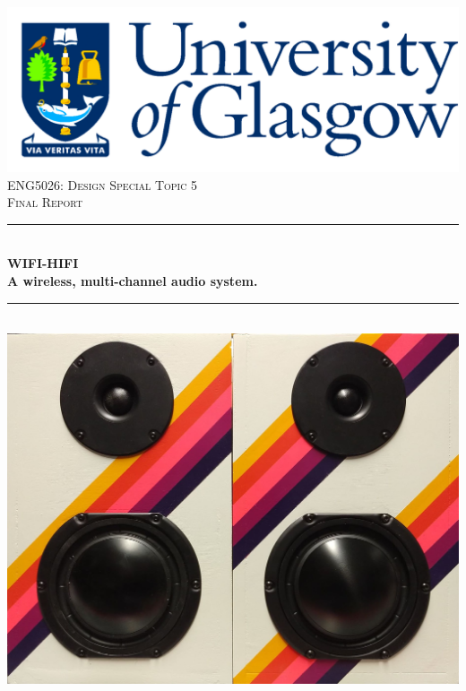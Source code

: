 \begin{titlepage}
\setcounter{page}{0}
\newcommand{\HRule}{\rule{\linewidth}{0.5mm}} %

\center %
 
\includegraphics[scale=0.1]{figs/GlaLogo.pdf}\\[0.5cm]

\vspace{1cm}
\textsc{\LARGE ENG5026: Design Special Topic 5}\\[0.5cm] 
\textsc{\Large Final Report}\\[0.5cm]


\HRule \\[0.4cm]
{ \huge \bfseries WIFI-HIFI \\
\vspace{0.5cm}
\large A wireless, multi-channel audio system.}\\[0.3cm] %
\HRule \\[1.5cm]
 
\includegraphics[scale=0.1]{./figs/speakersFront.jpg}\\[0.5cm]


\end{titlepage}
